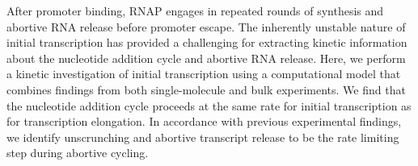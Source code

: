 After promoter binding, RNAP engages in repeated rounds of synthesis and
abortive RNA release before promoter escape. The inherently unstable
nature of initial transcription has provided a challenging for extracting kinetic
information about the nucleotide addition cycle and abortive RNA release.
Here, we perform a kinetic investigation of initial transcription using a
computational model that combines findings from both single-molecule and bulk
experiments. We find that the nucleotide addition cycle proceeds at the same
rate for initial transcription as for transcription elongation. In accordance
with previous experimental findings, we identify unscrunching and abortive
transcript release to be the rate limiting step during abortive cycling.
